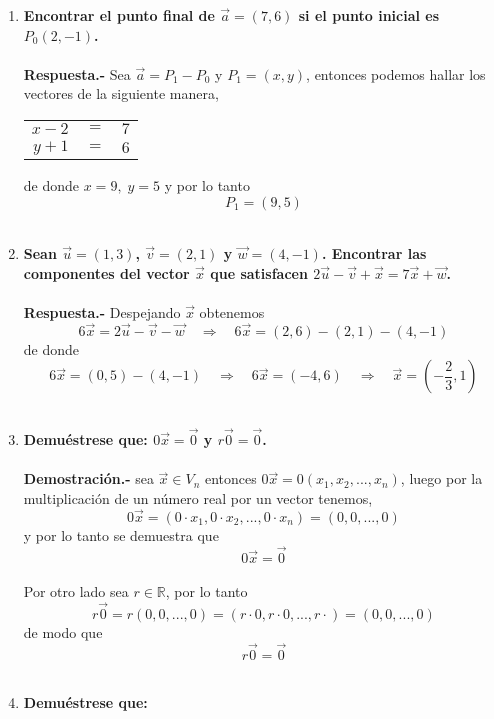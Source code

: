 \begin{enumerate}

\item \textbf{\boldmath Encontrar el punto final de $\vec{a}=(7,6)$ si el punto inicial es $P_0(2,-1)$.\\\\
    Respuesta.-}\; Sea $\vec{a}=P_1-P_0$ y $P_1=(x,y)$, entonces podemos hallar los vectores de la siguiente manera,
    \begin{center}
    \begin{tabular}{rcl}
	$x-2$&$=$&$7$\\
	$y+1$&$=$&$6$\\
    \end{tabular}
    \end{center}
    de donde $x=9, \; y=5$ y por lo tanto $$P_1=(9,5)$$\\

\item \textbf{\boldmath Sean $\vec{u}=(1,3)$,  $\vec{v}=(2,1)$ y $\vec{w}=(4,-1)$. Encontrar las componentes del vector $\vec{x}$ que satisfacen $2\vec{u}-\vec{v}+\vec{x}=7\vec{x}+\vec{w}$.\\\\
    Respuesta.-}\; Despejando $\vec{x}$ obtenemos $$6\vec{x}=2\vec{u}-\vec{v}-\vec{w} \quad \Longrightarrow\quad 6\vec{x}=(2,6)-(2,1)-(4,-1)$$ 
    de donde $$6\vec{x}=(0,5)-(4,-1)\quad \Longrightarrow \quad 6\vec{x}=(-4,6) \quad \Longrightarrow \quad \vec{x}=\left(-\dfrac{2}{3},1\right)$$\\

\item \textbf{\boldmath Demuéstrese que: $0\vec{x}=\vec{0}$ y $r\vec{0}=\vec{0}$.\\\\
    Demostración.-}\; sea $\vec{x}\in V_n$ entonces $0\vec{x}=0(x_1,x_2,...,x_n)$, luego por la multiplicación de un número real por un vector tenemos, $$0\vec{x}=(0\cdot x_1,0\cdot x_2,...,0\cdot x_n)=(0,0,...,0)$$
    y por lo tanto se demuestra que $$0\vec{x}=\vec{0}$$\\
    Por otro lado sea $r\in \mathbb{R}$, por lo tanto $$r\vec{0}=r(0,0,...,0)=(r\cdot 0,r\cdot 0,...,r\cdot)=(0,0,...,0)$$
    de modo que $$r\vec{0}=\vec{0}$$\\

\item \textbf{Demuéstrese que:}
\begin{enumerate}[\bfseries a)]


\end{enumerate}
\end{enumerate}
